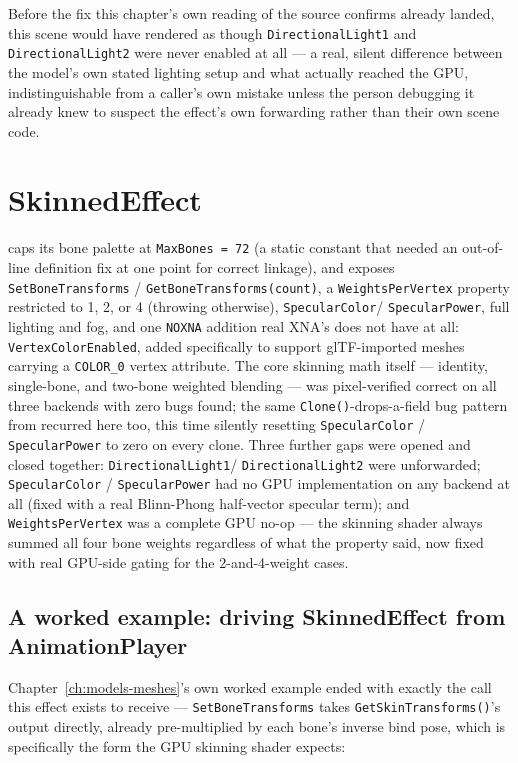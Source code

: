 Before the fix this chapter's own reading of the source confirms already landed, this scene
would have rendered as though \texttt{DirectionalLight1} and \texttt{DirectionalLight2} were
never enabled at all --- a real, silent difference between the model's own stated lighting setup
and what actually reached the GPU, indistinguishable from a caller's own mistake unless the
person debugging it already knew to suspect the effect's own forwarding rather than their own
scene code.

\section{SkinnedEffect}

 caps its bone palette at \texttt{MaxBones = 72} (a static constant
that needed an out-of-line definition fix at one point for correct linkage), and exposes
\texttt{SetBoneTransforms} / \texttt{GetBoneTransforms(count)}, a \texttt{WeightsPerVertex}
property restricted to 1, 2, or 4 (throwing otherwise), \texttt{SpecularColor}/%
\texttt{SpecularPower}, full lighting and fog, and one \texttt{NOXNA} addition real XNA's
 does not have at all: \texttt{VertexColorEnabled}, added
specifically to support glTF-imported meshes carrying a \texttt{COLOR\_0} vertex attribute.
The core skinning math itself --- identity, single-bone, and two-bone weighted blending ---
was pixel-verified correct on all three backends with zero bugs found; the same
\texttt{Clone()}-drops-a-field bug pattern from  recurred here
too, this time silently resetting \texttt{SpecularColor} / \texttt{SpecularPower} to zero on
every clone. Three further gaps were opened and closed together: \texttt{DirectionalLight1}/%
\texttt{DirectionalLight2} were unforwarded; \texttt{SpecularColor} / \texttt{SpecularPower}
had no GPU implementation on any backend at all (fixed with a real Blinn-Phong half-vector
specular term); and \texttt{WeightsPerVertex} was a complete GPU no-op --- the skinning
shader always summed all four bone weights regardless of what the property said, now fixed
with real GPU-side gating for the 2-and-4-weight cases.

\subsection{A worked example: driving SkinnedEffect from AnimationPlayer}

Chapter~\ref{ch:models-meshes}'s own worked  example ended with
exactly the call this effect exists to receive --- \texttt{SetBoneTransforms} takes
\texttt{GetSkinTransforms()}'s output directly, already pre-multiplied by each bone's inverse
bind pose, which is specifically the form the GPU skinning shader expects:

